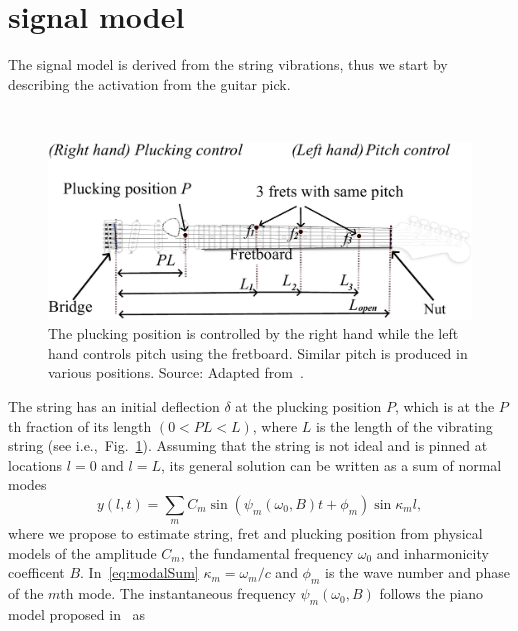 
\section{signal model}
The signal model is derived from the string vibrations, thus we start by describing the activation from the guitar pick. 
%
\begin{figure}[h!]\
  \centering
  \centerline{\includegraphics[width=1\columnwidth]{img/fender_drawing4.png}}
  \caption{The plucking position is controlled by the right hand while the left hand controls pitch using the fretboard. Similar pitch is produced in various positions. Source: Adapted from~\cite{phillips}.
  }\label{fig:guitar_overview}\vspace{-2mm}
\end{figure}
%
The string has an initial deflection $\delta$ at the plucking position $P$, which is at the $P$th fraction of its length $(0<PL<L)$, where $L$ is the length of the vibrating string (see i.e.,~Fig.~\ref{fig:guitar_overview}). 
%
Assuming that the string is not ideal and is pinned at locations $l=0$ and $l=L$, its general solution can be written as a sum of normal modes~\cite{fletcher:physics_of_musical_instruments}
%
\begin{equation}\label{eq:modalSum}
    y(l,t) = \sum_m C_m\sin(\psi_m(\omega_0,B)t+\phi_m)\sin\kappa_ml,
\end{equation}
%
where we propose to estimate string, fret and plucking position from physical models of the amplitude $C_m$, the fundamental frequency $\omega_0$ and inharmonicity coefficent $B$. In~\eqref{eq:modalSum} $\kappa_m = \omega_m / c$ and $\phi_m$ is the wave number and phase of the $m$th mode. The instantaneous frequency $\psi_m(\omega_0,B)$ follows the piano model proposed in~\cite{fletcher:piano_model} as 
